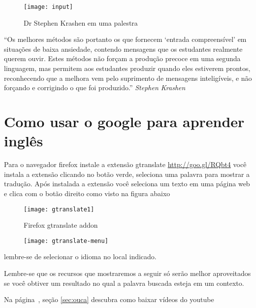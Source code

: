 \begin{figure}[h!]
	\centering
	\caption{Dr Stephen Krashen em uma palestra}
	\texttt{[image: input]}
\end{figure}

\vspace{0.3\baselineskip}
\noindent
``Os melhores métodos são portanto os que fornecem `entrada compreensível'
em situações de baixa ansiedade, contendo mensagens que os estudantes realmente
querem ouvir. Estes métodos não forçam a produção precoce em uma segunda linguagem, mas
permitem aos estudantes produzir quando eles estiverem prontos, reconhecendo
que a melhora vem pelo suprimento de mensagens inteligíveis, e não forçando e
corrigindo o que foi produzido.'' {\em Stephen Krashen}


\newpage
\section{Como usar o google para aprender inglês}\label{sec:google}

\noindent Para o navegador firefox instale a extensão gtranslate
\href{http://goo.gl/RQbt4}{http://goo.gl/RQbt4} você instala a extensão
clicando no botão verde, seleciona uma palavra para mostrar a tradução.
Após instalada a extensão você seleciona um texto em uma página web e clica com o botão
direito como visto na figura abaixo

\begin{figure}[h!]
	\centering
	\caption{\footnotesize Firefox gtranslate addon}
	\texttt{[image: gtranslate1]}
\end{figure}

\begin{figure}[h!]
	\centering
	\texttt{[image: gtranslate-menu]}
\end{figure}

\begin{center}
\noindent
{\footnotesize {} lembre-se de selecionar o idioma no local indicado.}
\end{center}

\noindent
{\footnotesize {} Lembre-se que os recursos que mostraremos a seguir só serão melhor aproveitados
se você obtiver um resultado no qual a palavra buscada esteja em um contexto.}

\vspace{0.3\baselineskip}
\noindent
{\footnotesize {} Na página~\pageref{img:video-helper}, seção \ref{sec:ouca}
descubra como baixar vídeos do youtube}

